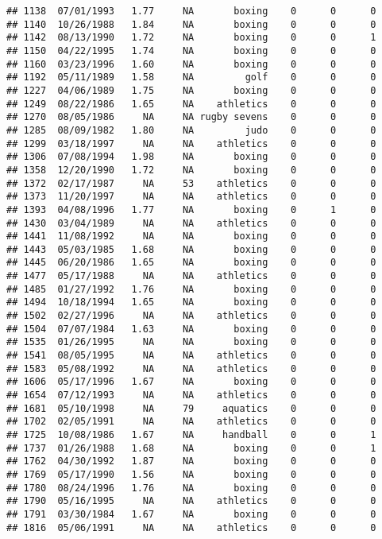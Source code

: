 \documentclass[]{article}
\begin{document}
\begin{verbatim}
## 1138  07/01/1993   1.77     NA       boxing    0      0      0
## 1140  10/26/1988   1.84     NA       boxing    0      0      0
## 1142  08/13/1990   1.72     NA       boxing    0      0      1
## 1150  04/22/1995   1.74     NA       boxing    0      0      0
## 1160  03/23/1996   1.60     NA       boxing    0      0      0
## 1192  05/11/1989   1.58     NA         golf    0      0      0
## 1227  04/06/1989   1.75     NA       boxing    0      0      0
## 1249  08/22/1986   1.65     NA    athletics    0      0      0
## 1270  08/05/1986     NA     NA rugby sevens    0      0      0
## 1285  08/09/1982   1.80     NA         judo    0      0      0
## 1299  03/18/1997     NA     NA    athletics    0      0      0
## 1306  07/08/1994   1.98     NA       boxing    0      0      0
## 1358  12/20/1990   1.72     NA       boxing    0      0      0
## 1372  02/17/1987     NA     53    athletics    0      0      0
## 1373  11/20/1997     NA     NA    athletics    0      0      0
## 1393  04/08/1996   1.77     NA       boxing    0      1      0
## 1430  03/04/1989     NA     NA    athletics    0      0      0
## 1441  11/08/1992     NA     NA       boxing    0      0      0
## 1443  05/03/1985   1.68     NA       boxing    0      0      0
## 1445  06/20/1986   1.65     NA       boxing    0      0      0
## 1477  05/17/1988     NA     NA    athletics    0      0      0
## 1485  01/27/1992   1.76     NA       boxing    0      0      0
## 1494  10/18/1994   1.65     NA       boxing    0      0      0
## 1502  02/27/1996     NA     NA    athletics    0      0      0
## 1504  07/07/1984   1.63     NA       boxing    0      0      0
## 1535  01/26/1995     NA     NA       boxing    0      0      0
## 1541  08/05/1995     NA     NA    athletics    0      0      0
## 1583  05/08/1992     NA     NA    athletics    0      0      0
## 1606  05/17/1996   1.67     NA       boxing    0      0      0
## 1654  07/12/1993     NA     NA    athletics    0      0      0
## 1681  05/10/1998     NA     79     aquatics    0      0      0
## 1702  02/05/1991     NA     NA    athletics    0      0      0
## 1725  10/08/1986   1.67     NA     handball    0      0      1
## 1737  01/26/1988   1.68     NA       boxing    0      0      1
## 1762  04/30/1992   1.87     NA       boxing    0      0      0
## 1769  05/17/1990   1.56     NA       boxing    0      0      0
## 1780  08/24/1996   1.76     NA       boxing    0      0      0
## 1790  05/16/1995     NA     NA    athletics    0      0      0
## 1791  03/30/1984   1.67     NA       boxing    0      0      0
## 1816  05/06/1991     NA     NA    athletics    0      0      0

\end{verbatim}
\end{document}
